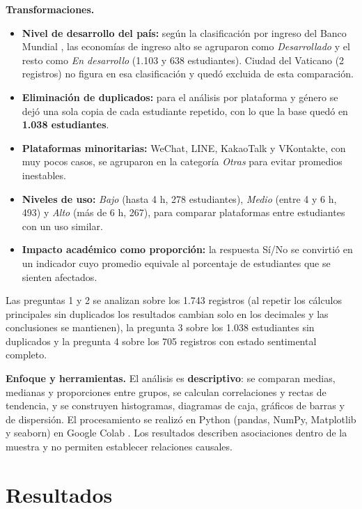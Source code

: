 \documentclass[10pt,a4paper]{article}
\begin{document}
\textbf{Transformaciones.}
\begin{itemize}
  \item \textbf{Nivel de desarrollo del país:} según la clasificación por ingreso del Banco Mundial
  \cite{bancomundial}, las economías de ingreso alto se agruparon como \emph{Desarrollado} y el resto como
  \emph{En desarrollo} (1.103 y 638 estudiantes). Ciudad del Vaticano (2 registros) no figura en esa
  clasificación y quedó excluida de esta comparación.
  \item \textbf{Eliminación de duplicados:} para el análisis por plataforma y género se dejó una sola copia
  de cada estudiante repetido, con lo que la base quedó en \textbf{1.038 estudiantes}.
  \item \textbf{Plataformas minoritarias:} WeChat, LINE, KakaoTalk y VKontakte, con muy pocos casos, se
  agruparon en la categoría \emph{Otras} para evitar promedios inestables.
  \item \textbf{Niveles de uso:} \emph{Bajo} (hasta 4 h, 278 estudiantes), \emph{Medio} (entre 4 y 6 h,
  493) y \emph{Alto} (más de 6 h, 267), para comparar plataformas entre estudiantes con un uso similar.
  \item \textbf{Impacto académico como proporción:} la respuesta Sí/No se convirtió en un indicador cuyo
  promedio equivale al porcentaje de estudiantes que se sienten afectados.
\end{itemize}

Las preguntas 1 y 2 se analizan sobre los 1.743 registros (al repetir los cálculos principales sin
duplicados los resultados cambian solo en los decimales y las conclusiones se mantienen), la pregunta 3
sobre los 1.038 estudiantes sin duplicados y la pregunta 4 sobre los 705 registros con estado sentimental
completo.

\textbf{Enfoque y herramientas.} El análisis es \textbf{descriptivo}: se comparan medias, medianas y
proporciones entre grupos, se calculan correlaciones y rectas de tendencia, y se construyen histogramas,
diagramas de caja, gráficos de barras y de dispersión. El procesamiento se realizó en Python (pandas,
NumPy, Matplotlib y seaborn) en Google Colab \cite{mckinney}. Los resultados describen asociaciones dentro
de la muestra y no permiten establecer relaciones causales.

\section{Resultados}
\end{document}

